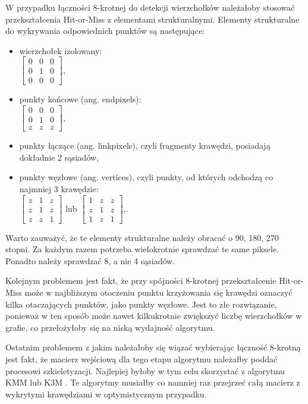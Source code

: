 \documentclass[a4paper,11pt,twoside]{report}
\theoremstyle{definition}
\begin{document}
W przypadku łączności 8-krotnej do detekcji wierzchołków należałoby stosować przekształcenia Hit-or-Miss z elementami strukturalnymi. Elementy strukturalne do wykrywania odpowiednich punktów są następujące:
\begin{itemize}%
\item wierzchołek izolowany: \\
$
\begin{bmatrix}
0 & 0 & 0 \\
0 & 1 & 0 \\
0 & 0 & 0 
\end{bmatrix}
$,
\item punkty końcowe (ang. endpixels): \\
$
\begin{bmatrix}
0 & 0 & 0 \\
0 & 1 & 0 \\
z & z & z 
\end{bmatrix}
$,
\item punkty łączące (ang. linkpixels), czyli fragmenty krawędzi, posiadają dokładnie 2 sąsiadów,
\item punkty węzłowe (ang. vertices), czyli punkty, od których odchodzą co najmniej 3 krawędzie: \\
$
\begin{bmatrix}
z & 1 & z \\
z & 1 & z \\
z & z & 1 
\end{bmatrix}
$ lub $
\begin{bmatrix}
1 & z & z \\
z & 1 & z \\
1 & z & 1 
\end{bmatrix}
$,.
\end{itemize}

Warto zauważyć, że te elementy strukturalne należy obracać o 90, 180, 270 stopni. Za każdym razem potrzeba wielokrotnie sprawdzać te same piksele. Ponadto należy sprawdzać 8, a nie 4 sąsiadów. 

Kolejnym problemem jest fakt, że przy spójności 8-krotnej przekształcenie Hit-or-Miss może w najbliższym otoczeniu punktu krzyżowania się krawędzi oznaczyć kilka otaczających punktów, jako punkty węzłowe. Jest to złe rozwiązanie, ponieważ w ten sposób może nawet kilkukrotnie zwiększyć liczbę wierzchołków w grafie, co przełożyłoby się na niską wydajność algorytmu.

Ostatnim problemem z jakim należałoby się wiązać wybierając łączność 8-krotną jest fakt, że macierz wejściową dla tego etapu algorytmu należałby poddać procesowi szkieletyzacji. Najlepiej byłoby w tym celu skorzystać z algorytmu KMM \cite{KMM} lub K3M \cite{K3M}. Te algorytmy musiałby co namniej raz przejrzeć całą macierz z wykrytymi krawędziami w optymistycznym przypadku.
\end{document}
